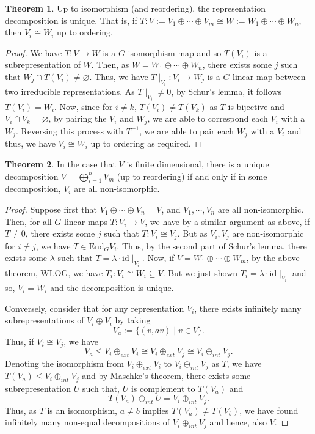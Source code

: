 \documentclass[]{article}
\theoremstyle{definition}
\newtheorem{theorem}{Theorem}
\theoremstyle{definition}
\begin{document}
\begin{theorem}
  Up to isomorphism (and reordering), the representation decomposition is unique.
  That is, if \(T : V := V_1 \oplus \cdots \oplus V_m \cong 
    W := W_1 \oplus \cdots \oplus W_n\), 
  then \(V_i \cong W_i\) up to ordering.
\end{theorem}
\begin{proof}
  We have \(T : V \to W\) is a \(G\)-isomorphism map and so \(T(V_i)\) is a 
  subrepresentation of \(W\). Then, as \(W = W_1 \oplus \cdots \oplus W_n\), 
  there exists some \(j\) such that \(W_j \cap T(V_i) \neq \varnothing\). Thus, 
  we have \(T\mid_{V_i} : V_i \to W_j\) is a \(G\)-linear map between two 
  irreducible representations. As \(T\mid_{V_i} \neq 0\), by Schur's lemma, it 
  follows \(T(V_i) = W_i\). Now, since for \(i \neq k\), \(T(V_i) \neq T(V_k)\) 
  as \(T\) is bijective and \(V_i \cap V_k = \varnothing\), by pairing the 
  \(V_i\) and \(W_j\), we are able to correspond each \(V_i\) with a \(W_j\). 
  Reversing this process with \(T^{-1}\), we are able to pair each \(W_j\) with
  a \(V_i\) and thus, we have \(V_i \cong W_i\) up to ordering as required.
\end{proof}

\begin{theorem}
  In the case that \(V\) is finite dimensional, there is a unique decomposition 
  \(V = \bigoplus_{i = 1}^n V_m\) (up to reordering) if and only if in some 
  decomposition, \(V_i\) are all non-isomorphic.
\end{theorem}
\begin{proof}
  Suppose first that \(V_1 \oplus \cdots \oplus V_n = V\), 
  and \(V_1, \cdots, V_n\) are all non-isomorphic. Then, for all \(G\)-linear maps
  \(T : V_i \to V\), we have by a similar argument as above, if \(T \neq 0\), 
  there exists some \(j\) such that \(T : V_i \cong V_j\). But as \(V_i, V_j\) 
  are non-isomorphic for \(i \neq j\), we have \(T \in \text{End}_G V_i\). Thus, 
  by the second part of Schur's lemma, there exists some \(\lambda\) such that 
  \(T = \lambda \cdot \text{id}\mid_{V_i}\). Now, if 
  \(V = W_1 \oplus \cdots \oplus W_m\), by the above theorem, WLOG, we have 
  \(T_i : V_i \cong W_i \subseteq V\). But we just shown 
  \(T_i = \lambda \cdot \text{id}\mid_{V_i}\) and so, \(V_i = W_i\) and the 
  decomposition is unique.

  Conversely, consider that for any representation \(V_i\), there exists infinitely
  many subrepresentations of \(V_i \oplus V_i\) by taking 
  \[V_a := \{(v, av) \mid v \in V\}.\]
  Thus, if \(V_i \cong V_j\), we have
  \[V_a \le V_i \oplus_{ext} V_i \cong V_i \oplus_{ext} V_j \cong V_i \oplus_{int} V_j.\]
  Denoting the isomorphism from \(V_i \oplus_{ext} V_i\) to \(V_i \oplus_{int} V_j\) 
  as \(T\), we have \(T(V_a) \le V_i \oplus_{int} V_j\) and by Maschke's theorem, 
  there exists some subrepresentation \(U\) such that, \(U\) is complement to 
  \(T(V_a)\) and
  \[T(V_a) \oplus_{int} U = V_i \oplus_{int} V_j.\]
  Thus, as \(T\) is an isomorphism, \(a \neq b\) implies \(T(V_a) \neq T(V_b)\), 
  we have found infinitely many non-equal decompositions of \(V_i \oplus_{int} V_j\) 
  and hence, also \(V\).
\end{proof}
\end{document}
